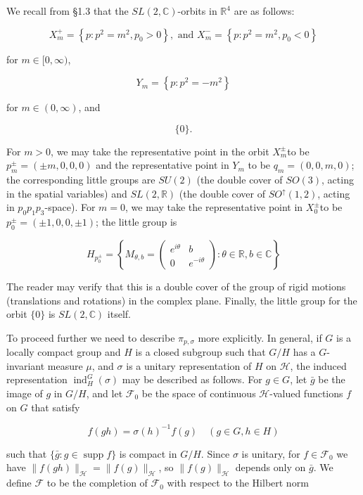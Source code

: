 \documentclass[10pt, letterpaper]{article}
\begin{document}
We recall from §1.3 that the $S L(2, \mathbb{C})$-orbits in $\mathbb{R}^{4}$ are as follows:

$$
X_{m}^{+}=\left\{p: p^{2}=m^{2}, p_{0}>0\right\}, \text { and } X_{m}^{-}=\left\{p: p^{2}=m^{2}, p_{0}<0\right\}
$$

for $m \in[0, \infty)$,

$$
Y_{m}=\left\{p: p^{2}=-m^{2}\right\}
$$

for $m \in(0, \infty)$, and

$$
\{0\} .
$$

For $m>0$, we may take the representative point in the orbit $X_{m}^{ \pm}$to be $p_{m}^{ \pm}= ( \pm m, 0,0,0)$ and the representative point in $Y_{m}$ to be $q_{m}=(0,0, m, 0)$; the corresponding little groups are $S U(2)$ (the double cover of $S O(3)$, acting in the spatial variables) and $S L(2, \mathbb{R})$ (the double cover of $S O^{\uparrow}(1,2)$, acting in $p_{0} p_{1} p_{3}$-space). For $m=0$, we may take the representative point in $X_{0}^{ \pm}$to be $p_{0}^{ \pm}=( \pm 1,0,0, \pm 1)$; the little group is

$$
H_{p_{0}^{ \pm}}=\left\{M_{\theta, b}=\left(\begin{array}{cc}
e^{i \theta} & b \\
0 & e^{-i \theta}
\end{array}\right): \theta \in \mathbb{R}, b \in \mathbb{C}\right\}
$$

The reader may verify that this is a double cover of the group of rigid motions (translations and rotations) in the complex plane. Finally, the little group for the orbit $\{0\}$ is $S L(2, \mathbb{C})$ itself.

To proceed further we need to describe $\pi_{p, \sigma}$ more explicitly. In general, if $G$ is a locally compact group and $H$ is a closed subgroup such that $G / H$ has a $G$-invariant measure $\mu$, and $\sigma$ is a unitary representation of $H$ on $\mathcal{H}$, the induced representation $\operatorname{ind}_{H}^{G}(\sigma)$ may be described as follows. For $g \in G$, let $\bar{g}$ be the image of $g$ in $G / H$, and let $\mathcal{F}_{0}$ be the space of continuous $\mathcal{H}$-valued functions $f$ on $G$ that satisfy

$$
f(g h)=\sigma(h)^{-1} f(g) \quad(g \in G, h \in H)
$$

such that $\{\bar{g}: g \in \operatorname{supp} f\}$ is compact in $G / H$. Since $\sigma$ is unitary, for $f \in \mathcal{F}_{0}$ we have $\|f(g h)\|_{\mathcal{H}}=\|f(g)\|_{\mathcal{H}}$, so $\|f(g)\|_{\mathcal{H}}$ depends only on $\bar{g}$. We define $\mathcal{F}$ to be the completion of $\mathcal{F}_{0}$ with respect to the Hilbert norm
\end{document}

